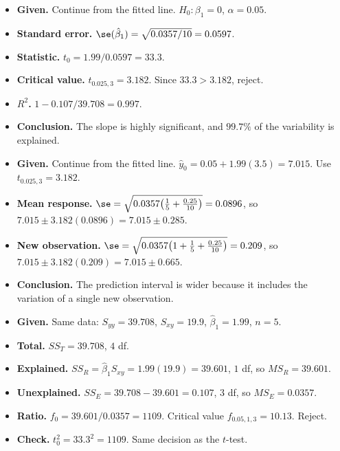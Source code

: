 \begin{example}
\begin{itemize}
  \item \textbf{Given.} Continue from the fitted line. $H_0:\beta_1=0$, $\alpha=0.05$.
  \item \textbf{Standard error.} $\se(\hat\beta_1)=\sqrt{0.0357/10}=0.0597$.
  \item \textbf{Statistic.} $t_0=1.99/0.0597=33.3$.
  \item \textbf{Critical value.} $t_{0.025,3}=3.182$. Since $33.3>3.182$, reject.
  \item \textbf{$R^2$.} $1-0.107/39.708=0.997$.
  \item \textbf{Conclusion.} The slope is highly significant, and $99.7\%$ of the variability is explained.
\end{itemize}
\end{example}

\begin{example}[Intervals at $x_0=3.5$]
\begin{itemize}
  \item \textbf{Given.} Continue from the fitted line. $\hat{y}_0=0.05+1.99(3.5)=7.015$. Use $t_{0.025,3}=3.182$.
  \item \textbf{Mean response.} $\se=\sqrt{0.0357\big(\tfrac15+\tfrac{0.25}{10}\big)}=0.0896$, so $7.015\pm3.182(0.0896)=7.015\pm0.285$.
  \item \textbf{New observation.} $\se=\sqrt{0.0357\big(1+\tfrac15+\tfrac{0.25}{10}\big)}=0.209$, so $7.015\pm3.182(0.209)=7.015\pm0.665$.
  \item \textbf{Conclusion.} The prediction interval is wider because it includes the variation of a single new observation.
\end{itemize}
\end{example}

\begin{example}
\begin{itemize}
  \item \textbf{Given.} Same data: $S_{yy}=39.708$, $S_{xy}=19.9$, $\hat\beta_1=1.99$, $n=5$.
  \item \textbf{Total.} $SS_T=39.708$, $4$ df.
  \item \textbf{Explained.} $SS_R=\hat\beta_1S_{xy}=1.99(19.9)=39.601$, $1$ df, so $MS_R=39.601$.
  \item \textbf{Unexplained.} $SS_E=39.708-39.601=0.107$, $3$ df, so $MS_E=0.0357$.
  \item \textbf{Ratio.} $f_0=39.601/0.0357=1109$. Critical value $f_{0.05,1,3}=10.13$. Reject.
  \item \textbf{Check.} $t_0^2=33.3^2=1109$. Same decision as the $t$-test.
\end{itemize}
\end{example}

